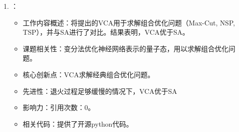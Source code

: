 \begin{enumerate}
            \item \citet{khandoker2022supplementing}：
            \begin{itemize}
                \item 工作内容概述：将\citet{hibat2021variational}提出的VCA用于求解组合优化问题（Max-Cut, NSP, TSP），并与SA进行了对比。结果表明，VCA优于SA。
                \item 课题相关性：变分法优化神经网络表示的量子态，用以求解组合优化问题。
                \item 核心创新点：VCA求解经典组合优化问题。
                \item 先进性：退火过程足够缓慢的情况下，VCA优于SA
                \item 影响力：引用次数：0。
                \item 相关代码：提供了开源python代码。
            \end{itemize}
    \end{enumerate}


